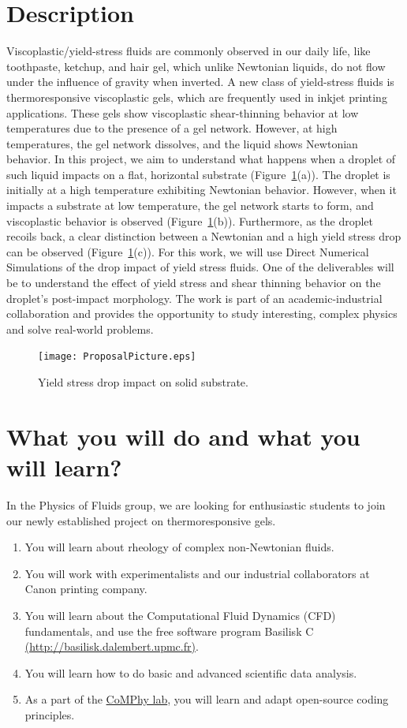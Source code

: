 \documentclass[11pt]{article}
\begin{document}
\section*{Description}
Viscoplastic/yield-stress fluids are commonly observed in our daily life, like toothpaste, ketchup, and hair gel, which unlike Newtonian liquids, do not flow under the influence of gravity when inverted. A new class of yield-stress fluids is thermoresponsive viscoplastic gels, which are frequently used in inkjet printing applications. These gels show viscoplastic shear-thinning behavior at low temperatures due to the presence of a gel network. However, at high temperatures, the gel network dissolves, and the liquid shows Newtonian behavior. In this project, we aim to understand what happens when a droplet of such liquid impacts on a flat, horizontal substrate (Figure~\ref{Fig::Fig1}(a)). The droplet is initially at a high temperature exhibiting Newtonian behavior. However, when it impacts a substrate at low temperature, the gel network starts to form, and viscoplastic behavior is observed (Figure~\ref{Fig::Fig1}(b)). Furthermore, as the droplet recoils back, a clear distinction between a Newtonian and a high yield stress drop can be observed (Figure~\ref{Fig::Fig1}(c)). For this work, we will use Direct Numerical Simulations of the drop impact of yield stress fluids. One of the deliverables will be to understand the effect of yield stress and shear thinning behavior on the droplet's post-impact morphology. The work is part of an academic-industrial collaboration and provides the opportunity to study interesting, complex physics and solve real-world problems. 
\begin{figure}[H]
 \begin{center}
  \texttt{[image: ProposalPicture.eps]}
 \end{center}
 \caption{Yield stress drop impact on solid substrate.}
 \label{Fig::Fig1}
\end{figure}

\section*{What you will do and what you will learn?}
In the Physics of Fluids group, we are looking for enthusiastic students to join our newly established project on thermoresponsive gels. 
\begin{enumerate}
	\item You will learn about rheology of complex non-Newtonian fluids. 
	\item You will work with experimentalists and our industrial collaborators at Canon printing company.
	\item You will learn about the Computational Fluid Dynamics (CFD) fundamentals, and use the free software program Basilisk C \href{http://basilisk.dalembert.upmc.fr}{(http://basilisk.dalembert.upmc.fr)}. 
	\item You will learn how to do basic and advanced scientific data analysis. 
	\item As a part of the \href{https://comphy-lab.org}{CoMPhy lab}, you will learn and adapt open-source coding principles. 
\end{enumerate}
\end{document}
